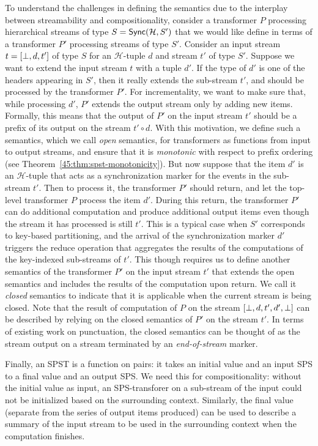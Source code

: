 To understand  the challenges in defining the semantics due to the interplay between streamability and compositionality, consider a transformer $P$ processing
hierarchical streams of type  $S=\mathsf{Sync}({\mathcal{H}}, S')$ that we would like
define in terms of a transformer $P'$ processing streams of type $S'$.
Consider an input stream $t=[\bot, d, t']$ of type $S$ for an $\mathcal{H}$-tuple $d$ and
stream $t'$ of type $S'$. Suppose we want to extend the input stream $t$ with
a tuple $d'$. If the type of $d'$ is one of the headers appearing in $S'$, then
it really extends the sub-stream $t'$, and should be processed by the transformer $P'$.
For incrementality, we want to make sure that, while processing $d'$, $P'$ extends the output stream only
by adding new items. Formally, this means that the output of $P'$ on the input
stream $t'$ should be a prefix of its output on the stream $t'\circ d$.
With this motivation, we define such a semantics, which we call \emph{open} semantics,
for transformers as functions from input to output streams, and ensure that it is \emph{monotonic}
 with respect to prefix ordering
(see Theorem~\ref{45:thm:spst-monotonicity}).
But now suppose that the item $d'$ is an ${\mathcal H}$-tuple
that acts as a synchronization marker for the events in the sub-stream $t'$.
Then to process it, the transformer $P'$ should return, and let the top-level
transformer $P$ process the item $d'$.
During this return, the transformer $P'$ can do additional computation and produce
additional output items even though the stream it has processed is still $t'$.
This is a typical case when $S'$ corresponds to key-based partitioning,
and the arrival of the synchronization marker $d'$ triggers the reduce operation
that aggregates the results of the computations of the key-indexed sub-streams of $t'$.
This though requires us to define another semantics of the transformer $P'$ on
the input stream $t'$ that extends the open semantics and includes the results
of the computation upon return. We call it \emph{closed} semantics to indicate
that it is applicable when the current stream  is being closed.
Note that the result of computation of $P$ on the stream $[\bot, d,t',d', \bot]$ can be
described by relying on the closed semantics of $P'$ on the stream $t'$.
In terms of existing work on punctuation,
the closed semantics can be thought of as the stream output on
a stream terminated by an \emph{end-of-stream} marker.

Finally, an SPST is a function on pairs:
it takes an initial value and an input
SPS to a final value and an output SPS.
We need this for compositionality: without the initial value as input, an SPS-transforer
on a sub-stream of the input could not be initialized based on the surrounding context.
Similarly, the final value (separate from the series of output items produced) can be
used to describe a summary of the input stream to be used in the surrounding context
when the computation finishes.

